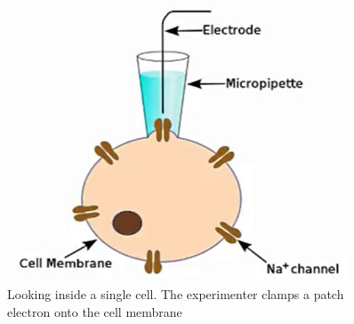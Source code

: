 \documentclass[]{article}
\begin{document}
\begin{figure}[H]
	\begin{center}
		\caption[Looking inside a single cell]{Looking inside a single cell. The experimenter clamps a patch electron onto the cell membrane}
		\includegraphics[width=0.9\textwidth]{looking-inside}
	\end{center}
\end{figure}
\end{document}
